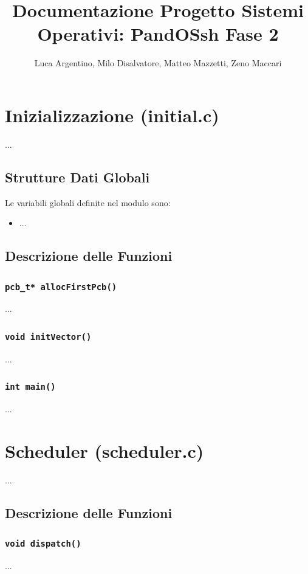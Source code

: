 \documentclass[a4paper,12pt]{article}
\title{Documentazione Progetto Sistemi Operativi: PandOSsh Fase 2}
\author{Luca Argentino, Milo Disalvatore, Matteo Mazzetti, Zeno Maccari}
\begin{document}
\maketitle

\section{Inizializzazione (initial.c)}
...

\vspace{0.5cm}
\subsection{Strutture Dati Globali}
Le variabili globali definite nel modulo sono:
\begin{itemize}
    \item ...
\end{itemize}

\vspace{0.5cm}
\subsection{Descrizione delle Funzioni}

\subsubsection{\texttt{pcb\_t* allocFirstPcb()}}
...

\subsubsection{\texttt{void initVector()}}
...

\subsubsection{\texttt{int main()}}
...

\section{Scheduler (scheduler.c)}
...

\vspace{0.5cm}
\subsection{Descrizione delle Funzioni}

\subsubsection{\texttt{void dispatch()}}
...
\end{document}
